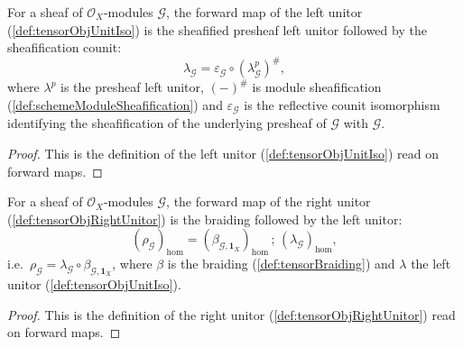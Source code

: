 \begin{lemma}
  \label{lem:tensorObjUnitIso_hom}
  For a sheaf of \(\mathcal{O}_X\)-modules \(\mathcal{G}\), the forward map of the
  left unitor (\cref{def:tensorObjUnitIso}) is the sheafified presheaf left unitor
  followed by the sheafification counit:
  \[
    \lambda_{\mathcal{G}}
      = \varepsilon_{\mathcal{G}} \circ (\lambda^p_{\mathcal{G}})^{\#},
  \]
  where \(\lambda^p\) is the presheaf left unitor, \((-)^{\#}\) is module
  sheafification (\cref{def:schemeModuleSheafification}) and
  \(\varepsilon_{\mathcal{G}}\) is the reflective counit isomorphism identifying
  the sheafification of the underlying presheaf of \(\mathcal{G}\) with
  \(\mathcal{G}\).
\end{lemma}

\begin{proof}


  This is the definition of the left unitor (\cref{def:tensorObjUnitIso}) read on
  forward maps.
\end{proof}

\begin{lemma}



  \label{lem:tensorObjRightUnitor_hom}
  For a sheaf of \(\mathcal{O}_X\)-modules \(\mathcal{G}\), the forward map of the
  right unitor (\cref{def:tensorObjRightUnitor}) is the braiding followed by the
  left unitor:
  \[
    (\rho_{\mathcal{G}})_{\mathrm{hom}}
      = (\beta_{\mathcal{G},\mathbf{1}_X})_{\mathrm{hom}}
        \,;\, (\lambda_{\mathcal{G}})_{\mathrm{hom}},
  \]
  i.e.\ \(\rho_{\mathcal{G}} = \lambda_{\mathcal{G}} \circ
  \beta_{\mathcal{G},\mathbf{1}_X}\), where \(\beta\) is the braiding
  (\cref{def:tensorBraiding}) and \(\lambda\) the left unitor
  (\cref{def:tensorObjUnitIso}).
\end{lemma}

\begin{proof}


  This is the definition of the right unitor (\cref{def:tensorObjRightUnitor}) read
  on forward maps.
\end{proof}


